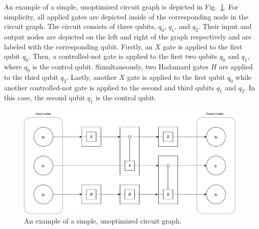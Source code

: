 An example of a simple, unoptimized circuit graph is depicted in Fig.~\ref{fig:circuit_graph_unoptimized}. For simplicity, all applied gates are depicted inside of the corresponding node in the circuit graph. The circuit consists of three qubits, $q_0$, $q_1$, and $q_2$. Their input and output nodes are depicted on the left and right of the graph respectively and are labeled with the corresponding qubit. Firstly, an $X$ gate is applied to the first qubit $q_0$. Then, a controlled-not gate is applied to the first two qubits $q_0$ and $q_1$, where $q_0$ is the control qubit. Simultaneously, two Hadamard gates $H$ are applied to the third qubit $q_2$. Lastly, another $X$ gate is applied to the first qubit $q_0$ while another controlled-not gate is applied to the second and third qubits $q_1$ and $q_2$. In this case, the second qubit $q_1$ is the control qubit.

\begin{figure}[htp]
    \centering     
    \includegraphics[width=.9\textwidth]{../figures/drawio/circuit_graph_unoptimized.pdf}
    \caption{An example of a simple, unoptimized circuit graph.}
    \label{fig:circuit_graph_unoptimized}
\end{figure}

